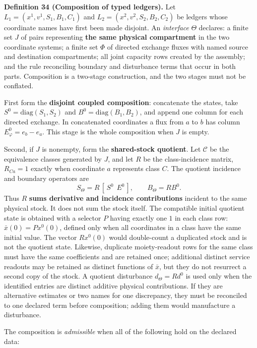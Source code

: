 \documentclass[11pt]{article}
\begin{document}
\textbf{Definition 34 (Composition of typed ledgers).} Let \(L_1 = (x^1, v^1, S_1, B_1, C_1)\) and \(L_2 = (x^2, v^2, S_2, B_2, C_2)\) be ledgers whose coordinate names have first been made disjoint. An \emph{interface} \(\Theta\) declares: a finite set \(J\) of pairs representing \textbf{the same physical compartment} in the two coordinate systems; a finite set \(\Phi\) of directed exchange fluxes with named source and destination compartments; all joint capacity rows created by the assembly; and the rule reconciling boundary and disturbance terms that occur in both parts. Composition is a two-stage construction, and the two stages must not be conflated.

First form the \textbf{disjoint coupled composition}: concatenate the states, take \(S^0=\mathrm{diag}(S_1,S_2)\) and \(B^0=\mathrm{diag}(B_1,B_2)\), and append one column for each directed exchange. In concatenated coordinates a flux from \(a\) to \(b\) has column \(E^0_\varphi=e_b-e_a\). This stage is the whole composition when \(J\) is empty.

Second, if \(J\) is nonempty, form the \textbf{shared-stock quotient}. Let \(\mathcal C\) be the equivalence classes generated by \(J\), and let \(R\) be the class-incidence matrix, \(R_{Ca}=1\) exactly when coordinate \(a\) represents class \(C\). The quotient incidence and boundary operators are
$$S_\Theta=R\,[\,S^0\ \ E^0\,],\qquad B_\Theta=RB^0.$$
Thus \(R\) \textbf{sums derivative and incidence contributions} incident to the same physical stock. It does not sum the stock itself. The compatible initial quotient state is obtained with a selector \(P\) having exactly one \(1\) in each class row: \(\bar x(0)=Px^0(0)\), defined only when all coordinates in a class have the same initial value. The vector \(Rx^0(0)\) would double-count a duplicated stock and is not the quotient state. Likewise, duplicate moiety-readout rows for the same class must have the same coefficients and are retained once; additional distinct service readouts may be retained as distinct functions of \(\bar x\), but they do not resurrect a second copy of the stock. A quotient disturbance \(d_\Theta=Rd^0\) is used only when the identified entries are distinct additive physical contributions. If they are alternative estimates or two names for one discrepancy, they must be reconciled to one declared term before composition; adding them would manufacture a disturbance.

The composition is \emph{admissible} when all of the following hold on the declared data:
\end{document}
